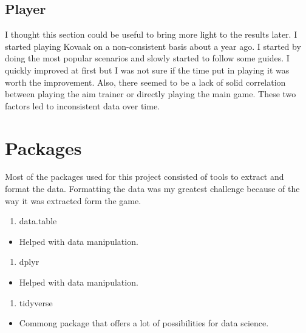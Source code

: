 \documentclass[
]{article}
\providecommand{\tightlist}{%
  \setlength{\itemsep}{0pt}\setlength{\parskip}{0pt}}
\begin{document}
\subsection{Player}

I thought this section could be useful to bring more light to the
results later. I started playing Kovaak on a non-consistent basis about
a year ago. I started by doing the most popular scenarios and slowly
started to follow some guides. I quickly improved at first but I was not
sure if the time put in playing it was worth the improvement. Also,
there seemed to be a lack of solid correlation between playing the aim
trainer or directly playing the main game. These two factors led to
inconsistent data over time.

\section*{Packages}

Most of the packages used for this project consisted of tools to extract
and format the data. Formatting the data was my greatest challenge
because of the way it was extracted form the game.

\begin{enumerate}
\def\labelenumi{\arabic{enumi}.}
\tightlist
\item
  data.table
\end{enumerate}

\begin{itemize}
\tightlist
\item
  Helped with data manipulation.
\end{itemize}

\begin{enumerate}
\def\labelenumi{\arabic{enumi}.}
\setcounter{enumi}{1}
\tightlist
\item
  dplyr
\end{enumerate}

\begin{itemize}
\tightlist
\item
  Helped with data manipulation.
\end{itemize}

\begin{enumerate}
\def\labelenumi{\arabic{enumi}.}
\setcounter{enumi}{2}
\tightlist
\item
  tidyverse
\end{enumerate}

\begin{itemize}
\tightlist
\item
  Commong package that offers a lot of possibilities for data science.
\end{itemize}
\end{document}
